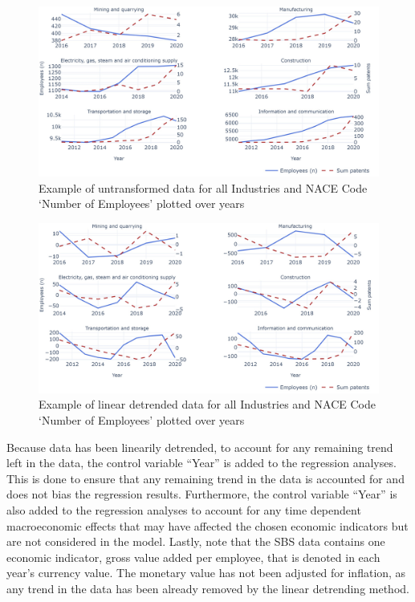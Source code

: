 \documentclass[
  11,
  a4paperpaper,
]{article}
\begin{document}
\begin{figure}[H]

{\centering \includegraphics{rieg2023_files/figure-pdf/fig-untransformed-data-example-output-1.jpeg}

}

\caption{\label{fig-untransformed-data-example}Example of untransformed
data for all Industries and NACE Code `Number of Employees' plotted over
years}

\end{figure}

\begin{figure}[H]

{\centering \includegraphics{rieg2023_files/figure-pdf/fig-transformed-data-example-output-1.jpeg}

}

\caption{\label{fig-transformed-data-example}Example of linear detrended
data for all Industries and NACE Code `Number of Employees' plotted over
years}

\end{figure}

Because data has been linearily detrended, to account for any remaining
trend left in the data, the control variable ``Year'' is added to the
regression analyses. This is done to ensure that any remaining trend in
the data is accounted for and does not bias the regression results.
Furthermore, the control variable ``Year'' is also added to the
regression analyses to account for any time dependent macroeconomic
effects that may have affected the chosen economic indicators but are
not considered in the model. Lastly, note that the SBS data contains one
economic indicator, gross value added per employee, that is denoted in
each year's currency value. The monetary value has not been adjusted for
inflation, as any trend in the data has been already removed by the
linear detrending method.
\end{document}
